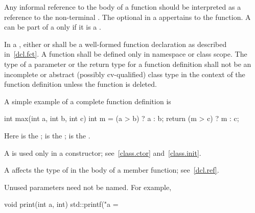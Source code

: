 Any informal reference to the body of a function should be interpreted as a reference to
the non-terminal .
The optional  in a 
appertains to the function.
A  can be part of a 
only if it is a .

\pnum
In a ,
either   \tcode{;}
or  \tcode{;}
shall be a well-formed function declaration
as described in~\ref{dcl.fct}.
A function shall be defined only in namespace or class scope.
The type of a parameter or the return type for a function
definition shall not be
an incomplete or abstract (possibly cv-qualified) class type
in the context of the function definition
unless the function is deleted.

\pnum
\begin{example}
A simple example of a complete function definition is

\begin{codeblock}
int max(int a, int b, int c) {
  int m = (a > b) ? a : b;
  return (m > c) ? m : c;
}
\end{codeblock}

Here
is the
;
is the
;
\tcode{\{ \commentellip{} \}}
is the
.
\end{example}

\pnum
{}%
%
%
A
is used only in a constructor; see~\ref{class.ctor} and~\ref{class.init}.

\pnum
\begin{note}
A  affects the type of 
in the body of a member function; see~\ref{dcl.ref}.
\end{note}

\pnum
\begin{note}
Unused parameters need not be named.
For example,

\begin{codeblock}
void print(int a, int) {
  std::printf("a = %
}
\end{codeblock}
\end{note}

